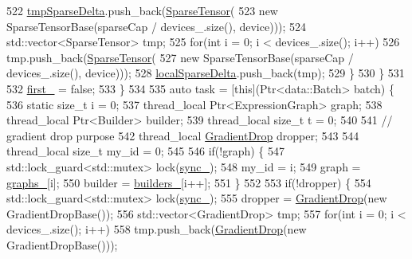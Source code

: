 \begin{DoxyCode}
522           \hyperlink{classmarian_1_1AsyncGraphGroup_aac1e70623a858adb914f6ed6a491c3a8}{tmpSparseDelta}.push\_back(\hyperlink{namespacemarian_a5484064f1fce2661d0b27a5c02a9392b}{SparseTensor}(
523               \textcolor{keyword}{new} SparseTensorBase(sparseCap / devices\_.size(), device)));
524           std::vector<SparseTensor> tmp;
525           \textcolor{keywordflow}{for}(\textcolor{keywordtype}{int} i = 0; i < devices\_.size(); i++)
526             tmp.push\_back(\hyperlink{namespacemarian_a5484064f1fce2661d0b27a5c02a9392b}{SparseTensor}(
527                 \textcolor{keyword}{new} SparseTensorBase(sparseCap / devices\_.size(), device)));
528           \hyperlink{classmarian_1_1AsyncGraphGroup_aa29abae307772ca69402a19729b2b49d}{localSparseDelta}.push\_back(tmp);
529         \}
530       \}
531 
532       \hyperlink{classmarian_1_1AsyncGraphGroup_af89976e48b8e21119bbf66ea7bc23d96}{first\_} = \textcolor{keyword}{false};
533     \}
534 
535     \textcolor{keyword}{auto} task = [\textcolor{keyword}{this}](Ptr<data::Batch> batch) \{
536       \textcolor{keyword}{static} \textcolor{keywordtype}{size\_t} i = 0;
537       thread\_local Ptr<ExpressionGraph> graph;
538       thread\_local Ptr<Builder> builder;
539       thread\_local \textcolor{keywordtype}{size\_t} t = 0;
540 
541       \textcolor{comment}{// gradient drop purpose}
542       thread\_local \hyperlink{namespacemarian_a000da7078105881168a3f17ce1b148bb}{GradientDrop} dropper;
543 
544       thread\_local \textcolor{keywordtype}{size\_t} my\_id = 0;
545 
546       \textcolor{keywordflow}{if}(!graph) \{
547         std::lock\_guard<std::mutex> lock(\hyperlink{classmarian_1_1AsyncGraphGroup_a7951c0c9d8da435a148b509ff9694d0f}{sync\_});
548         my\_id = i;
549         graph = \hyperlink{classmarian_1_1AsyncGraphGroup_a3fbad41763c988a5723a39c2220287d8}{graphs\_}[i];
550         builder = \hyperlink{classmarian_1_1AsyncGraphGroup_a61b13f7dea620b83b33958d0b8970601}{builders\_}[i++];
551       \}
552 
553       \textcolor{keywordflow}{if}(!dropper) \{
554         std::lock\_guard<std::mutex> lock(\hyperlink{classmarian_1_1AsyncGraphGroup_a7951c0c9d8da435a148b509ff9694d0f}{sync\_});
555         dropper = \hyperlink{namespacemarian_a000da7078105881168a3f17ce1b148bb}{GradientDrop}(\textcolor{keyword}{new} GradientDropBase());
556         std::vector<GradientDrop> tmp;
557         \textcolor{keywordflow}{for}(\textcolor{keywordtype}{int} i = 0; i < devices\_.size(); i++)
558           tmp.push\_back(\hyperlink{namespacemarian_a000da7078105881168a3f17ce1b148bb}{GradientDrop}(\textcolor{keyword}{new} GradientDropBase()));

\end{DoxyCode}
